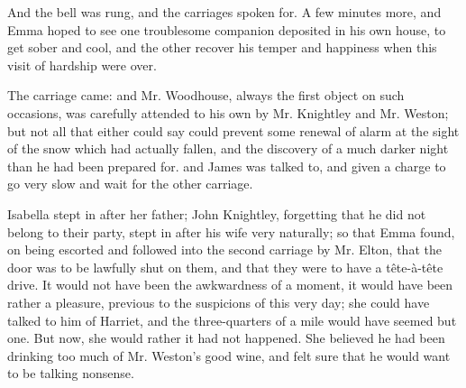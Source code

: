 



And the bell was rung, and the carriages spoken for. A few minutes more, and Emma hoped to see one troublesome companion deposited in his own house, to get sober and cool, and the other recover his temper and happiness when this visit of hardship were over.

The carriage came: and Mr. Woodhouse, always the first object on such occasions, was carefully attended to his own by Mr. Knightley and Mr. Weston; but not all that either could say could prevent some renewal of alarm at the sight of the snow which had actually fallen, and the discovery of a much darker night than he had been prepared for.  and James was talked to, and given a charge to go very slow and wait for the other carriage.

Isabella stept in after her father; John Knightley, forgetting that he did not belong to their party, stept in after his wife very naturally; so that Emma found, on being escorted and followed into the second carriage by Mr. Elton, that the door was to be lawfully shut on them, and that they were to have a tête-à-tête drive. It would not have been the awkwardness of a moment, it would have been rather a pleasure, previous to the suspicions of this very day; she could have talked to him of Harriet, and the three-quarters of a mile would have seemed but one. But now, she would rather it had not happened. She believed he had been drinking too much of Mr. Weston's good wine, and felt sure that he would want to be talking nonsense.

